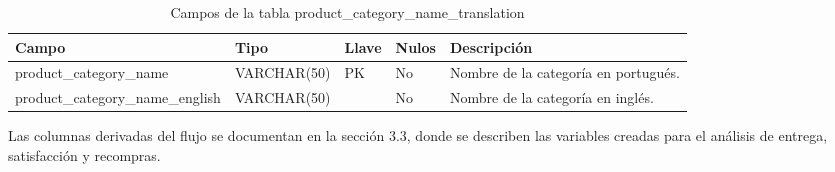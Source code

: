 \documentclass[a4paper,stu,12pt,donotrepeattitle,floatsintext]{apa7}
\begin{document}
{\footnotesize
\begin{longtable}{|>{\raggedright\arraybackslash}p{}|>{\raggedright\arraybackslash}p{}|>{\raggedright\arraybackslash}p{}|>{\raggedright\arraybackslash}p{}|>{\raggedright\arraybackslash}p{}|}
\caption{Campos de la tabla product\_category\_name\_translation}\\
\hline
\textbf{Campo} & \textbf{Tipo} & \textbf{Llave} & \textbf{Nulos} & \textbf{Descripción} \\ \hline
\endhead
product\_\allowbreak{}category\_\allowbreak{}name & VARCHAR(50) & PK & No & Nombre de la categoría en portugués. \\ \hline
product\_\allowbreak{}category\_\allowbreak{}name\_\allowbreak{}english & VARCHAR(50) &  & No & Nombre de la categoría en inglés. \\ \hline
\end{longtable}
}
Las columnas derivadas del flujo se documentan en la sección 3.3, donde se describen las variables creadas para el análisis de entrega, satisfacción y recompras.

\end{document}
